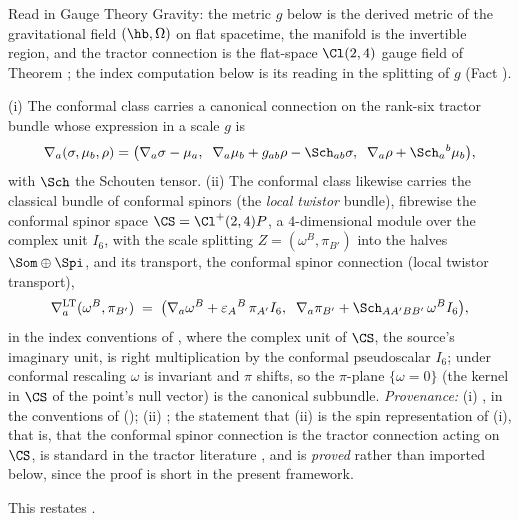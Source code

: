 Read in Gauge Theory Gravity: the metric $g$ below is the derived metric of the gravitational field $(\hb, \Omega)$ on flat spacetime, the manifold is the invertible region, and the tractor connection is the flat-space $\Cl(2,4)$ gauge field of Theorem ; the index computation below is its reading in the splitting of $g$ (Fact ).

(i) The conformal class carries a canonical connection on the rank-six tractor bundle whose expression in a scale $g$ is
\[
\nabla_a(\sigma, \mu_b, \rho) = \bigl(\nabla_a\sigma - \mu_a,\;\; \nabla_a\mu_b + g_{ab}\rho - \Sch_{ab}\sigma,\;\; \nabla_a\rho + \Sch_a{}^b\mu_b\bigr),
\]
with $\Sch$ the Schouten tensor. (ii) The conformal class likewise carries the classical bundle of conformal spinors (the \emph{local twistor} bundle), fibrewise the conformal spinor space $\CS = \Cl^+(2,4)P$, a $4$-dimensional module over the complex unit $I_6$, with the scale splitting $Z = (\omega^B, \pi_{B'})$ into the halves $\Som \oplus \Spi$, and its transport, the conformal spinor connection (local twistor transport),
\[
\nabla^{\mathrm{LT}}_a(\omega^B, \pi_{B'}) \;=\; \bigl(\nabla_a \omega^B + \varepsilon_A{}^B\,\pi_{A'}I_6,\;\; \nabla_a\pi_{B'} + \Sch_{AA'BB'}\,\omega^B I_6\bigr),
\]
in the index conventions of \cite[Vol.~2, Ch.~6]{PenroseRindler86}, where the complex unit of $\CS$, the source's imaginary unit, is right multiplication by the conformal pseudoscalar $I_6$; under conformal rescaling $\omega$ is invariant and $\pi$ shifts, so the $\pi$-plane $\{\omega = 0\}$ (the kernel in $\CS$ of the point's null vector) is the canonical subbundle. \emph{Provenance:} (i) \cite{BEG1994, CurryGover2018}, in the conventions of \cite[Fact 4.1, eq.~(3)]{ButlerT6} (); (ii) \cite{PenroseMacCallum73, Dighton74}; the statement that (ii) is the spin representation of (i), that is, that the conformal spinor connection is the tractor connection acting on $\CS$, is standard in the tractor literature \cite{BEG1994, CurryGover2018}, and is \emph{proved} rather than imported below, since the proof is short in the present framework.

This restates .
